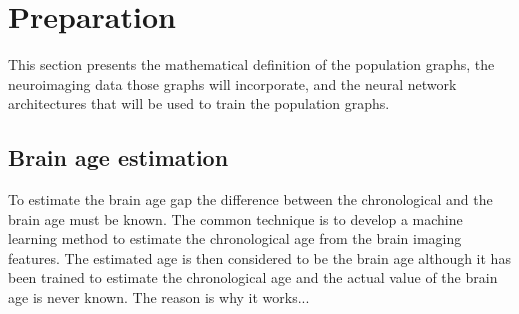 \chapter{Preparation}

This section presents the mathematical definition of the population graphs, the neuroimaging data those graphs will incorporate, and the neural network architectures that will be used to train the population graphs.


\section{Brain age estimation}
To estimate the brain age gap the difference between the chronological and the brain age must be known. The common technique is to develop a machine learning method to estimate the chronological age from the brain imaging features. The estimated age is then considered to be the brain age although it has been trained to estimate the chronological age and the actual value of the brain age is never known. The reason is why it works... \cite{niu2019improved}

